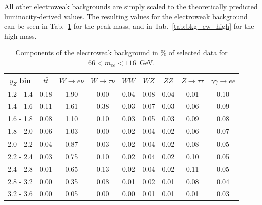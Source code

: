 All other electroweak backgrounds are simply scaled to the theoretically predicted luminocity-derived values. The resulting values for the electroweak background can be seen in Tab.~\ref{tab:bkg_ew_peak} for the peak mass, and in Tab.~\ref{tab:bkg_ew_high} for the high mass.

\begin{table}
\centering
\begin{tabular}{ c cccccccc } \hline \hline
 $y_Z$ bin & $t\bar t$ & $W \to e\nu$ & $W \to \tau\nu$ &  $WW$ & $WZ$ & $ZZ$ & $Z \to \tau\tau$  & $\gamma\gamma \to ee$\\  \hline
 1.2 -  1.4 &   0.18 &   1.90 &   0.00 &   0.04 &   0.08 &   0.04 &   0.01 &   0.10 \\
 1.4 -  1.6 &   0.11 &   1.61 &   0.38 &   0.03 &   0.07 &   0.03 &   0.06 &   0.09 \\
 1.6 -  1.8 &   0.08 &   1.10 &   0.10 &   0.03 &   0.05 &   0.03 &   0.09 &   0.08 \\
 1.8 -  2.0 &   0.06 &   1.03 &   0.00 &   0.02 &   0.04 &   0.02 &   0.06 &   0.07 \\
 2.0 -  2.2 &   0.04 &   0.87 &   0.03 &   0.02 &   0.04 &   0.02 &   0.08 &   0.05 \\
 2.2 -  2.4 &   0.03 &   0.75 &   0.10 &   0.02 &   0.04 &   0.02 &   0.10 &   0.05 \\
 2.4 -  2.8 &   0.01 &   0.65 &   0.13 &   0.02 &   0.04 &   0.02 &   0.11 &   0.05 \\
 2.8 -  3.2 &   0.00 &   0.35 &   0.08 &   0.01 &   0.02 &   0.01 &   0.08 &   0.04 \\
 3.2 -  3.6 &   0.00 &   0.05 &   0.00 &   0.00 &   0.01 &   0.01 &   0.01 &   0.03 \\
\hline \hline
\end{tabular}
\caption{Components of the electroweak background  in \% of selected data for $66 < m_{ee} < 116$~GeV.}
\label{tab:bkg_ew_peak}
\end{table}


